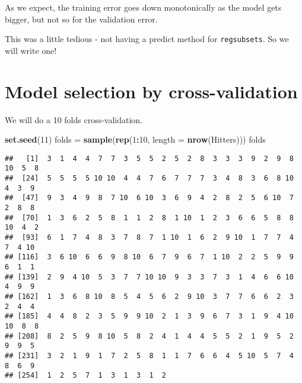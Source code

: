 \documentclass[]{article}
\newenvironment{Shaded}{\begin{snugshade}}{\end{snugshade}}
\newcommand{\KeywordTok}[1]{\textcolor[rgb]{0.13,0.29,0.53}{\textbf{#1}}}
\newcommand{\DataTypeTok}[1]{\textcolor[rgb]{0.13,0.29,0.53}{#1}}
\newcommand{\DecValTok}[1]{\textcolor[rgb]{0.00,0.00,0.81}{#1}}
\newcommand{\StringTok}[1]{\textcolor[rgb]{0.31,0.60,0.02}{#1}}
\newcommand{\CommentTok}[1]{\textcolor[rgb]{0.56,0.35,0.01}{\textit{#1}}}
\newcommand{\ControlFlowTok}[1]{\textcolor[rgb]{0.13,0.29,0.53}{\textbf{#1}}}
\newcommand{\OperatorTok}[1]{\textcolor[rgb]{0.81,0.36,0.00}{\textbf{#1}}}
\newcommand{\NormalTok}[1]{#1}
\begin{document}
As we expect, the training error goes down monotonically as the model
gets bigger, but not so for the validation error.

This was a little tedious - not having a predict method for
\texttt{regsubsets}. So we will write one!

\begin{Shaded}
\end{Shaded}

\section{Model selection by
cross-validation}\label{model-selection-by-cross-validation}

We will do a 10 folds cross-validation.

\begin{Shaded}
\begin{Highlighting}[]
\KeywordTok{set.seed}\NormalTok{(}\DecValTok{11}\NormalTok{)}
\NormalTok{folds =}\StringTok{ }\KeywordTok{sample}\NormalTok{(}\KeywordTok{rep}\NormalTok{(}\DecValTok{1}\OperatorTok{:}\DecValTok{10}\NormalTok{, }\DataTypeTok{length =} \KeywordTok{nrow}\NormalTok{(Hitters)))}
\NormalTok{folds}
\end{Highlighting}
\end{Shaded}

\begin{verbatim}
##   [1]  3  1  4  4  7  7  3  5  5  2  5  2  8  3  3  3  9  2  9  8 10  5  8
##  [24]  5  5  5  5 10 10  4  4  7  6  7  7  7  3  4  8  3  6  8 10  4  3  9
##  [47]  9  3  4  9  8  7 10  6 10  3  6  9  4  2  8  2  5  6 10  7  2  8  8
##  [70]  1  3  6  2  5  8  1  1  2  8  1 10  1  2  3  6  6  5  8  8 10  4  2
##  [93]  6  1  7  4  8  3  7  8  7  1 10  1  6  2  9 10  1  7  7  4  7  4 10
## [116]  3  6 10  6  6  9  8 10  6  7  9  6  7  1 10  2  2  5  9  9  6  1  1
## [139]  2  9  4 10  5  3  7  7 10 10  9  3  3  7  3  1  4  6  6 10  4  9  9
## [162]  1  3  6  8 10  8  5  4  5  6  2  9 10  3  7  7  6  6  2  3  2  4  4
## [185]  4  4  8  2  3  5  9  9 10  2  1  3  9  6  7  3  1  9  4 10 10  8  8
## [208]  8  2  5  9  8 10  5  8  2  4  1  4  4  5  5  2  1  9  5  2  9  9  5
## [231]  3  2  1  9  1  7  2  5  8  1  1  7  6  6  4  5 10  5  7  4  8  6  9
## [254]  1  2  5  7  1  3  1  3  1  2
\end{verbatim}
\end{document}
